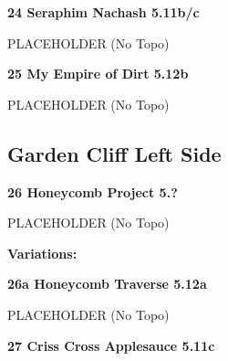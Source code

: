 \begin{multicols}{2}
			
			
			\needspace{1.5cm}
\label{rt:Seraphim Nachash}
\colorbox{RoyalBlue!20}{
\parbox{0.95\linewidth}{
\textbf{
24 Seraphim Nachash 5.11b/c  
}}}

			\begin{adjustwidth}{0.5cm}{}			
			PLACEHOLDER (No Topo)
			\end{adjustwidth}
			
			
			
			\needspace{1.5cm}
\label{rt:My Empire of Dirt}
\colorbox{Goldenrod!50}{
\parbox{0.95\linewidth}{
\textbf{
25 My Empire of Dirt 5.12b  
}}}

			\begin{adjustwidth}{0.5cm}{}			
			PLACEHOLDER (No Topo)
			\end{adjustwidth}
			
			
		
		
		\needspace{1.5cm}
		\subsection*{Garden Cliff Left Side}\label{bf:Garden Cliff Left Side}
			
		
			
			\needspace{1.5cm}
\label{rt:Honeycomb Project}
\colorbox{black!20}{
\parbox{0.95\linewidth}{
\textbf{
26 Honeycomb Project 5.?  
}}}

			\begin{adjustwidth}{0.5cm}{}			
			PLACEHOLDER (No Topo)
			\end{adjustwidth}
			
				\begin{adjustwidth}{0.5cm}{}				
				\needspace{3cm}
				\textbf{Variations:} \newline
					
					\needspace{1.5cm}
\label{vr:Honeycomb Traverse}
\colorbox{Goldenrod!50}{
\parbox{0.95\linewidth}{
\textbf{
26a Honeycomb Traverse 5.12a  
}}}

					\begin{adjustwidth}{0.5cm}{}			
					PLACEHOLDER (No Topo)
					\end{adjustwidth}
					
					
				\end{adjustwidth}
			
			
			\needspace{1.5cm}
\label{rt:Criss Cross Applesauce}
\colorbox{RoyalBlue!20}{
\parbox{0.95\linewidth}{
\textbf{
27 Criss Cross Applesauce 5.11c  
}}}


\end{multicols}
